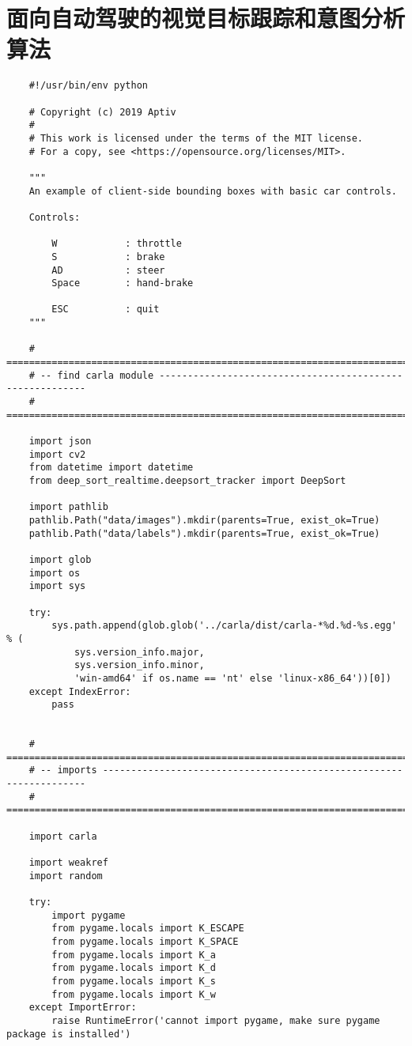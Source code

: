 \section{面向自动驾驶的视觉目标跟踪和意图分析算法}
\begin{lstlisting}
	#!/usr/bin/env python
	
	# Copyright (c) 2019 Aptiv
	#
	# This work is licensed under the terms of the MIT license.
	# For a copy, see <https://opensource.org/licenses/MIT>.
	
	"""
	An example of client-side bounding boxes with basic car controls.
	
	Controls:
	
	    W            : throttle
	    S            : brake
	    AD           : steer
	    Space        : hand-brake
	
	    ESC          : quit
	"""
	
	# ==============================================================================
	# -- find carla module ---------------------------------------------------------
	# ==============================================================================
	
	import json
	import cv2
	from datetime import datetime
	from deep_sort_realtime.deepsort_tracker import DeepSort
	
	import pathlib
	pathlib.Path("data/images").mkdir(parents=True, exist_ok=True)
	pathlib.Path("data/labels").mkdir(parents=True, exist_ok=True)
	
	import glob
	import os
	import sys
	
	try:
	    sys.path.append(glob.glob('../carla/dist/carla-*%d.%d-%s.egg' % (
	        sys.version_info.major,
	        sys.version_info.minor,
	        'win-amd64' if os.name == 'nt' else 'linux-x86_64'))[0])
	except IndexError:
	    pass
	
	
	# ==============================================================================
	# -- imports -------------------------------------------------------------------
	# ==============================================================================
	
	import carla
	
	import weakref
	import random
	
	try:
	    import pygame
	    from pygame.locals import K_ESCAPE
	    from pygame.locals import K_SPACE
	    from pygame.locals import K_a
	    from pygame.locals import K_d
	    from pygame.locals import K_s
	    from pygame.locals import K_w
	except ImportError:
	    raise RuntimeError('cannot import pygame, make sure pygame package is installed')
	

\end{lstlisting}
